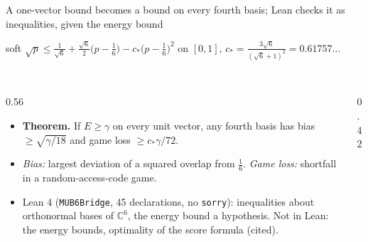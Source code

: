 \documentclass[aspectratio=169,11pt,t]{beamer}
\newcommand{\tg}[2]{{\setlength{\fboxsep}{1.2pt}\colorbox{#1}{\textcolor{white}{\sffamily\bfseries\footnotesize\,#2\,}}}}
\newcommand{\Tproved}{\tg{cProved}{proved}}
\newcommand{\Tleanh}{\tg{cLeanH}{Lean-checked}}
\newcommand{\C}{\mathbb{C}}
\newcommand{\cstar}{c_\ast}
\begin{document}
\begin{frame}{A one-vector bound becomes a bound on every fourth basis; Lean checks it as inequalities, given the energy bound}
\small
\begin{beamercolorbox}[wd=\textwidth,sep=3pt,rounded=true]{soft}
\centering
$\displaystyle\sqrt p\le\tfrac1{\sqrt6}+\tfrac{\sqrt6}2\bigl(p-\tfrac16\bigr)-\cstar\bigl(p-\tfrac16\bigr)^2$ on $[0,1]$, $\cstar=\tfrac{3\sqrt6}{(\sqrt6+1)^2}=0.61757\ldots$ \Tproved\ \Tleanh
\end{beamercolorbox}
\vspace{0.1cm}
\begin{columns}[T]
\begin{column}{0.56\textwidth}
\begin{itemize}\setlength\itemsep{4pt}
\item \textbf{Theorem.} If $E\ge\gamma$ on every unit vector, any fourth basis has bias $\ge\sqrt{\gamma/18}$ and game loss $\ge\cstar\gamma/72$. \Tproved
\item \emph{Bias:} largest deviation of a squared overlap from $\tfrac16$. \emph{Game loss:} shortfall in a random-access-code game.
\item Lean 4 (\texttt{MUB6Bridge}, 45 declarations, no \texttt{sorry}): inequalities about orthonormal bases of $\C^6$, the energy bound a hypothesis. Not in Lean: the energy bounds, optimality of the score formula (cited).
\end{itemize}
\end{column}
\begin{column}{0.42\textwidth}
\centering
{}
\end{column}
\end{columns}
\end{frame}
\end{document}
